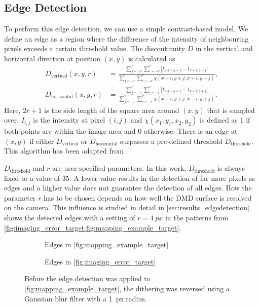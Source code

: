 \subsection{Edge Detection}
To perform this edge detection, we can use a simple contrast-based model. We define an edge as a region where the difference of the intensity of neighbouring pixels exceeds a certain threshold value. The discontinuity $D$ in the vertical and horizontal direction at position $(x,y)$ is calculated as
\begin{align*}
    D_\text{vertical}(x,y,r) &= \frac{\sum_{j=-r}^{r} \sum_{i=-r}^{r} \left| I_{x+i,y+j} - I_{x+i,y-j} \right|}{\sum_{j=-r}^{r} \sum_{i=-r}^{r} \chi (x+i,y+j,x+i,y-j)}, \\
    D_\text{horizontal}(x,y,r) &= \frac{\sum_{j=-r}^{r} \sum_{i=-r}^{r} \left| I_{x+i,y+j} - I_{x-i,y+j} \right|}{\sum_{j=-r}^{r} \sum_{i=-r}^{r} \chi (x+i,y+j,x-i,y+j)}.
\end{align*}
Here, $2r+1$ is the side length of the square area around $(x,y)$ that is sampled over, $I_{i,j}$ is the intensity at pixel $(i,j)$ and $\chi(x_1,y_1,x_2,y_2)$ is defined as 1 if both points are within the image area and 0 otherwise. There is an edge at $(x,y)$ if either $D_\text{vertical}$ or $D_\text{horizontal}$ surpasses a pre-defined threshold $D_\text{threshold}$. This algorithm has been adapted from \cite{wu:2015}. 

$D_\text{threshold}$ and $r$ are user-specified parameters. In this work, $D_\text{threshold}$ is always fixed to a value of 35. A lower value results in the detection of far more pixels as edges and a higher value does not guarantee the detection of all edges. How the parameter $r$ has to be chosen depends on how well the DMD surface is resolved on the camera. This influence is studied in detail in \cref{sec:results_edgedetection}.
 shows the detected edges with a setting of $r=\SI{4}{px}$ in the patterns from \cref{fig:imaging_error_target,fig:mapping_example_target}.
\begin{figure}[htbp]
    \centering
    \begin{subfigure}[t]{0.49\textwidth}
        \centering
        \caption{Edges in \cref{fig:mapping_example_target}}
    \end{subfigure}
    \begin{subfigure}[t]{0.49\textwidth}
        \centering
        \caption{Edges in \cref{fig:imaging_error_target}}
    \end{subfigure}
    \caption[Examplary results of the edge detection algorithm]{Before the edge detection was applied to \cref{fig:mapping_example_target}, the dithering was reversed using a Gaussian blur filter with a \SI{1}{px} radius.}
    \label{fig:edge_detection_example}      
\end{figure}


